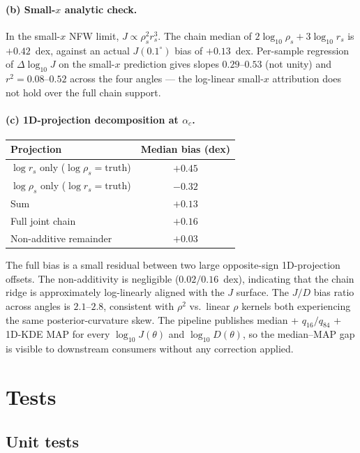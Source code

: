 \documentclass[11pt]{article}
\begin{document}
\paragraph{(b) Small-$x$ analytic check.}
In the small-$x$ NFW limit, $J\propto\rho_s^2 r_s^3$.  The chain
median of $2\log_{10}\rho_s + 3\log_{10} r_s$ is $+0.42$~dex,
against an actual $J(0.1^\circ)$ bias of $+0.13$~dex.  Per-sample
regression of $\Delta\log_{10} J$ on the small-$x$ prediction gives
slopes $0.29$--$0.53$ (not unity) and $r^2 = 0.08$--$0.52$ across
the four angles --- the log-linear small-$x$ attribution does not
hold over the full chain support.

\paragraph{(c) 1D-projection decomposition at $\alpha_c$.}
\begin{center}
\begin{tabular}{lc}
\hline
Projection & Median bias (dex) \\
\hline
$\log r_s$ only ($\log\rho_s = \mathrm{truth}$) & $+0.45$ \\
$\log\rho_s$ only ($\log r_s = \mathrm{truth}$) & $-0.32$ \\
Sum & $+0.13$ \\
Full joint chain & $+0.16$ \\
Non-additive remainder & $+0.03$ \\
\hline
\end{tabular}
\end{center}
The full bias is a small residual between two large opposite-sign
1D-projection offsets.  The non-additivity is negligible
($0.02/0.16$~dex), indicating that the chain ridge is approximately
log-linearly aligned with the $J$ surface.  The $J/D$ bias ratio
across angles is $2.1$--$2.8$, consistent with $\rho^2$ vs.\ linear
$\rho$ kernels both experiencing the same posterior-curvature skew.
The pipeline publishes median + $q_{16}/q_{84}$ + 1D-KDE MAP for
every $\log_{10} J(\theta)$ and $\log_{10} D(\theta)$, so the
median--MAP gap is visible to downstream consumers without any
correction applied.

\section{Tests}
\label{sec:tests}

\subsection{Unit tests}
\label{sec:unit}
\end{document}
